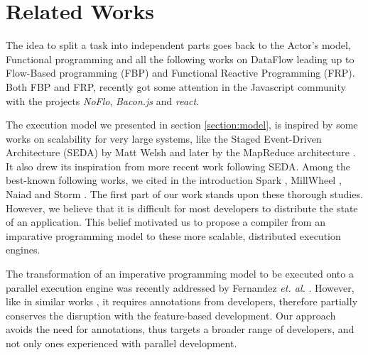 \section{Related Works} \label{section:related}

The idea to split a task into independent parts goes back to the Actor's model, Functional programming and all the following works on DataFlow leading up to Flow-Based programming (FBP) and Functional Reactive Programming (FRP).
Both FBP and FRP, recently got some attention in the Javascript community with the projects \textit{NoFlo}, \textit{Bacon.js} and \textit{react}.

The execution model we presented in section \ref{section:model}, is inspired by some works on scalability for very large systems, like the Staged Event-Driven Architecture (SEDA) by Matt Welsh \cite{Welsh2000} and later by the MapReduce architecture \cite{Dean2008}.
It also drew its inspiration from more recent work following SEDA.
Among the best-known following works, we cited in the introduction Spark \cite{Zaharia2012}, MillWheel \cite{Akidau2013}, Naiad \cite{McSherry} and Storm \cite{Toshniwal2014}.
The first part of our work stands upon these thorough studies.
However, we believe that it is difficult for most developers to distribute the state of an application.
This belief motivated us to propose a compiler from an imparative programming model to these more scalable, distributed execution engines.


The transformation of an imperative programming model to be executed onto a parallel execution engine was recently addressed by Fernandez \textit{et. al.} \cite{Fernandez2014a}.
However, like in similar works \cite{Power2010}, it requires annotations from developers, therefore partially conserves the disruption with the feature-based development.
Our approach avoids the need for annotations, thus targets a broader range of developers, and not only ones experienced with parallel development.

